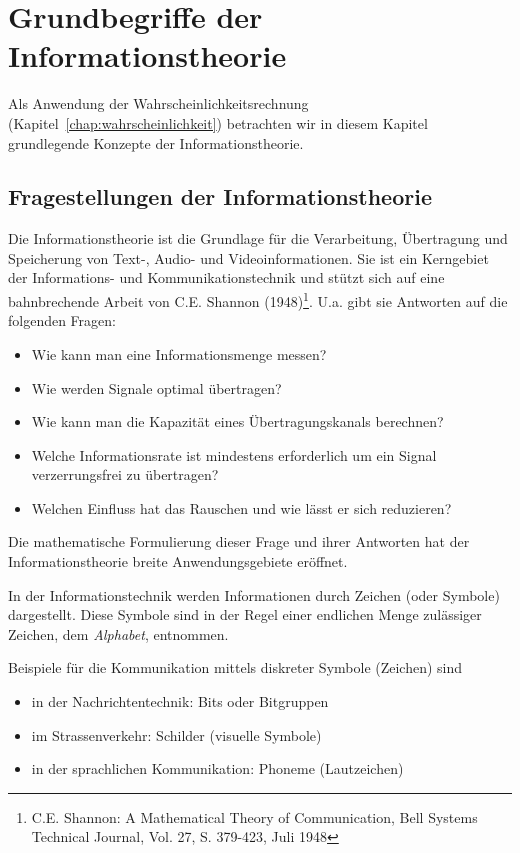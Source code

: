 \chapter{Grundbegriffe der Informationstheorie}
\label{chap:informationstheorie}

Als Anwendung der Wahrscheinlichkeitsrechnung (Kapitel~\ref{chap:wahrscheinlichkeit}) betrachten wir in diesem Kapitel grundlegende Konzepte der Informationstheorie.

\section{Fragestellungen der Informationstheorie}
\label{sec:informationstheorie-fragen}

Die Informationstheorie ist die Grundlage für die Verarbeitung, Übertragung und Speicherung von Text-, Audio- und Videoinformationen. Sie ist ein Kerngebiet der Informations- und Kommunikationstechnik und stützt sich auf eine bahnbrechende Arbeit von C.E. Shannon (1948)\footnote{C.E. Shannon: A Mathematical Theory of Communication, Bell Systems Technical Journal, Vol. 27, S. 379-423, Juli 1948}. U.a. gibt sie Antworten auf die folgenden Fragen:

\begin{itemize}
  \item Wie kann man eine Informationsmenge messen?
  \item Wie werden Signale optimal übertragen?
  \item Wie kann man die Kapazität eines Übertragungskanals berechnen?
  \item Welche Informationsrate ist mindestens erforderlich um ein Signal verzerrungsfrei zu übertragen?
  \item Welchen Einfluss hat das Rauschen und wie lässt er sich reduzieren?
\end{itemize}

Die mathematische Formulierung dieser Frage und ihrer Antworten hat der Informationstheorie breite Anwendungsgebiete eröffnet.

In der Informationstechnik werden Informationen durch Zeichen (oder Symbole) dargestellt. Diese Symbole sind in der Regel einer endlichen Menge zulässiger Zeichen, dem \textit{Alphabet}, entnommen.

Beispiele für die Kommunikation mittels diskreter Symbole (Zeichen) sind

\begin{itemize}
  \item in der Nachrichtentechnik: Bits oder Bitgruppen
  \item im Strassenverkehr: Schilder (visuelle Symbole)
  \item in der sprachlichen Kommunikation: Phoneme (Lautzeichen)
\end{itemize}

